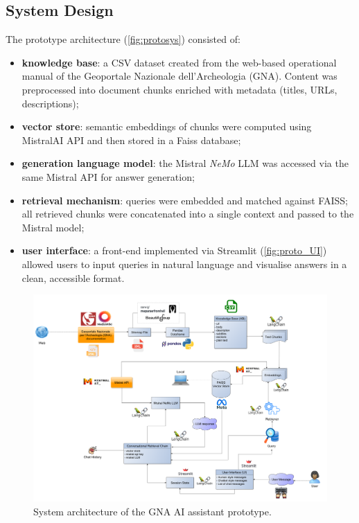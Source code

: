 \begin{spacing}{1.5}
\subsection{System Design}
The prototype architecture (\autoref{fig:protosys}) consisted of:
\begin{itemize}
      \item \textbf{knowledge base}: a CSV dataset created from the web-based operational manual of the Geoportale Nazionale dell’Archeologia (GNA). Content was preprocessed into document chunks enriched with metadata (titles, URLs, descriptions);
      \item \textbf{vector store}: semantic embeddings of chunks were computed using MistralAI API and then stored in a Faiss database;
      \item \textbf{generation language model}: the Mistral \textit{NeMo} LLM was accessed via the same Mistral API for answer generation;
      \item \textbf{retrieval mechanism}: queries were embedded and matched against FAISS; all retrieved chunks were concatenated into a single context and passed to the Mistral model;
      \item \textbf{user interface}: a front-end implemented via Streamlit (\autoref{fig:proto_UI}) allowed users to input queries in natural language and visualise answers in a clean, accessible format.
\end{itemize}


\begin{figure}[H]
  \centering
  \includegraphics[width=\textwidth]{images/prototype_diagram.png} 
  \caption{System architecture of the GNA AI assistant prototype.}
  \label{fig:protosys}
\end{figure}


\end{spacing}
